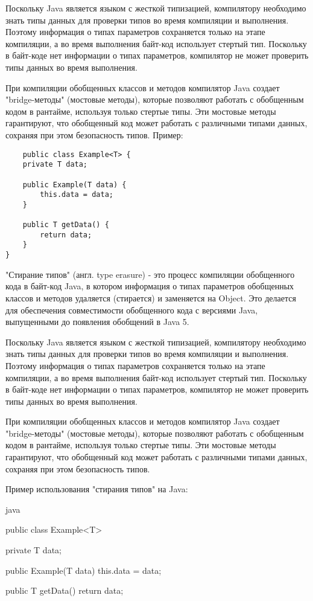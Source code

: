 Поскольку Java является языком с жесткой типизацией, компилятору необходимо знать типы данных для проверки типов во время компиляции и выполнения. Поэтому информация о типах параметров сохраняется только на этапе компиляции, а во время выполнения байт-код использует стертый тип. Поскольку в байт-коде нет информации о типах параметров, компилятор не может проверить типы данных во время выполнения.

При компиляции обобщенных классов и методов компилятор Java создает "bridge-методы" (мостовые методы), которые позволяют работать с обобщенным кодом в рантайме, используя только стертые типы. Эти мостовые методы гарантируют, что обобщенный код может работать с различными типами данных, сохраняя при этом безопасность типов.
Пример:
\begin{lstlisting}
    public class Example<T> {
    private T data;

    public Example(T data) {
        this.data = data;
    }

    public T getData() {
        return data;
    }
}
\end{lstlisting}
"Стирание типов" (англ. type erasure) - это процесс компиляции обобщенного кода в байт-код Java, в котором информация о типах параметров обобщенных классов и методов удаляется (стирается) и заменяется на Object. Это делается для обеспечения совместимости обобщенного кода с версиями Java, выпущенными до появления обобщений в Java 5.

Поскольку Java является языком с жесткой типизацией, компилятору необходимо знать типы данных для проверки типов во время компиляции и выполнения. Поэтому информация о типах параметров сохраняется только на этапе компиляции, а во время выполнения байт-код использует стертый тип. Поскольку в байт-коде нет информации о типах параметров, компилятор не может проверить типы данных во время выполнения.

При компиляции обобщенных классов и методов компилятор Java создает "bridge-методы" (мостовые методы), которые позволяют работать с обобщенным кодом в рантайме, используя только стертые типы. Эти мостовые методы гарантируют, что обобщенный код может работать с различными типами данных, сохраняя при этом безопасность типов.

Пример использования "стирания типов" на Java:

java

public class Example<T> {
    private T data;

    public Example(T data) {
        this.data = data;
    }

    public T getData() {
        return data;
    }
}

